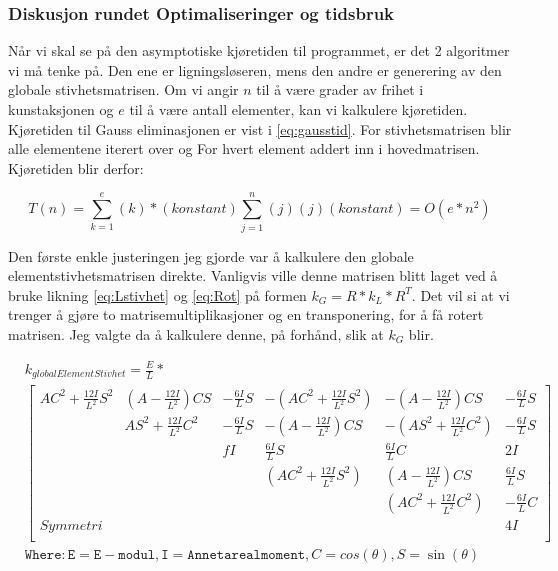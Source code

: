 \documentclass[10pt,a4paper, norsk]{article}
\begin{document}
\subsubsection{Diskusjon rundet Optimaliseringer og tidsbruk}
Når vi skal se på den asymptotiske kjøretiden til programmet, er det 2 algoritmer vi må tenke på. Den ene er ligningsløseren, mens den andre er generering av den globale stivhetsmatrisen. Om vi angir $n$ til å være grader av frihet i kunstaksjonen og $e$ til å være antall elementer, kan vi kalkulere kjøretiden. Kjøretiden til Gauss eliminasjonen er vist i \eqref{eq:gausstid}. For stivhetsmatrisen blir alle elementene iterert over og For hvert element addert inn i hovedmatrisen. Kjøretiden blir derfor:

\begin{equation} \label{eq:en3}
T(n) = \sum_{k=1}^{e} (k)*(konstant) \sum_{j=1}^{n} (j)(j)(konstant) = O(e*n^2)
\end{equation}  


Den første enkle justeringen jeg gjorde var å kalkulere den globale elementstivhetsmatrisen direkte. Vanligvis ville denne matrisen blitt laget ved å bruke likning \ref{eq:Lstivhet} og \ref{eq:Rot} på formen $k_G=R*k_L*R^T$. Det vil si at vi trenger å gjøre to matrisemultiplikasjoner og en transponering, for å få rotert matrisen. Jeg valgte da å kalkulere denne, på forhånd, slik at $k_G$ blir. 

\begin{equation} 
\begin{aligned}
& k_{global Element Stivhet} = \frac{E}{L} * \\ 
&\begin{bmatrix}
AC^2+\frac{12I}{L^2} S^2  & (A-\frac{12I}{L^2})CS  &  -\frac{6I}{L}S & -(AC^2+\frac{12I}{L^2}S^2) & -(A-\frac{12I}{L^2})CS &  -\frac{6I}{L}S \\
 & AS^2 + \frac{12I}{L^2}C^2 & -\frac{6I}{L}S & -(A-\frac{12I}{L^2})CS & -(AS^2+\frac{12I}{L^2}C^2) &  -\frac{6I}{L}S \\
 & & fI &  \frac{6I}{L}S & \frac{6I}{L}C & 2I \\
 & & & (AC^2+\frac{12I}{L^2}S^2) & (A-\frac{12I}{L^2})CS & \frac{6I}{L}S\\
 & & & & (AC^2+\frac{12I}{L^2}C^2) & -\frac{6I}{L}C \\
 Symmetri & & & & & 4I \\
\end{bmatrix} \\
& \mathtt{ Where: E=E-modul, I=Annet arealmoment, } C=cos(\theta), S=\sin(\theta) \\
\end{aligned}
\end{equation}
\end{document}
